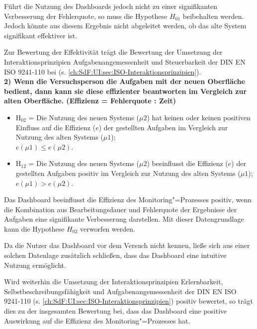 Führt die Nutzung des Dash\-boards jedoch nicht zu einer signifikanten Verbesserung der Fehlerquote, so muss die Hypothese $H_{01}$ beibehalten werden. Jedoch könnte aus diesem Ergebnis nicht abgeleitet werden, ob das alte System signifikant effektiver ist.

Zur Bewertung der Effektivität trägt die Bewertung der Umsetzung der Interaktionsprinzipien Aufgabenangemessenheit und Steuerbarkeit der DIN EN ISO 9241-110 \cite{DIN_EN_ISO_9241-110} bei (s. \autoref{ch:SdF:UI:sec:ISO-Interaktionsprinzipien}).\\

\noindent
\textbf{2) Wenn die Versuchsperson die Aufgaben mit der neuen Oberfläche bedient, dann kann sie diese effizienter beantworten im Vergleich zur alten Oberfläche. (Effizienz = Fehlerquote : Zeit)}

\begin{itemize}
    \item H$_{02}$ = Die Nutzung des neuen Systems ($\mu2$) hat keinen oder keinen positiven Einfluss auf die Effizienz ($e$) der gestellten Aufgaben im Vergleich zur Nutzung des alten Systems ($\mu1$); \\$e(\mu1) \leq e(\mu2)$.
    \item H$_{12}$ = Die Nutzung des neuen Systems ($\mu2$) beeinflusst die Effizienz ($e$) der gestellten Aufgaben positiv im Vergleich zur Nutzung des alten Systems ($\mu1$); \\$e(\mu1) > e(\mu2)$.
\end{itemize}

\noindent
Das Dashboard beeinflusst die Effizienz des Monitoring"=Prozesses positiv, wenn die Kombination aus Bearbeitungsdauer und Fehlerquote der Ergebnisse der Aufgaben eine signifikante Verbesserung darstellen. Mit dieser Datengrundlage kann die Hypothese $H_{02}$ verworfen werden.

Da die Nutzer das Dash\-board vor dem Versuch nicht kennen, ließe sich aus einer solchen Datenlage zusätzlich schließen, dass das Dash\-board eine intuitive Nutzung ermöglicht.

Wird weiterhin die Umsetzung der Interaktionsprinzipien Erlernbarkeit, Selbstbeschreibungsfähigkeit und Aufgabenangemessenheit der DIN EN ISO 9241-110 \cite{DIN_EN_ISO_9241-110}  (s. \autoref{ch:SdF:UI:sec:ISO-Interaktionsprinzipien}) positiv bewertet, so trägt dies zu der insgesamten Bewertung bei, dass das Dash\-board eine positive Auswirkung auf die Effizienz des Monitoring"=Prozesses hat.

